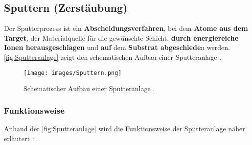 \documentclass{article} %
\begin{document}
\vspace{1em}
\subsection{Sputtern (Zerstäubung)} %

Der Sputterprozess ist ein \textbf{Abscheidungsverfahren}, bei dem \textbf{Atome aus dem Target}, der Materialquelle für die gewünschte Schicht, 
\textbf{durch energiereiche Ionen herausgeschlagen} und \textbf{auf} dem \textbf{Substrat abgeschiede}n werden. \autoref{fig:Sputteranlage}
zeigt den schematischen Aufbau einer Sputteranlage \cite{keplinger2024}.

\begin{figure}[htb!]
    \centering
    \texttt{[image: images/Sputtern.png]} %
    \captionsetup{labelfont=bf} %
    \caption{Schematischer Aufbau einer Sputteranlage \cite{keplinger2024}.}
    \label{fig:Sputteranlage}
\end{figure}

\vspace{1em}
\subsubsection{Funktionsweise} %
Anhand der \autoref{fig:Sputteranlage} wird die Funktionsweise der Sputteranlage näher erläutert \cite{keplinger2024}:
\end{document}
